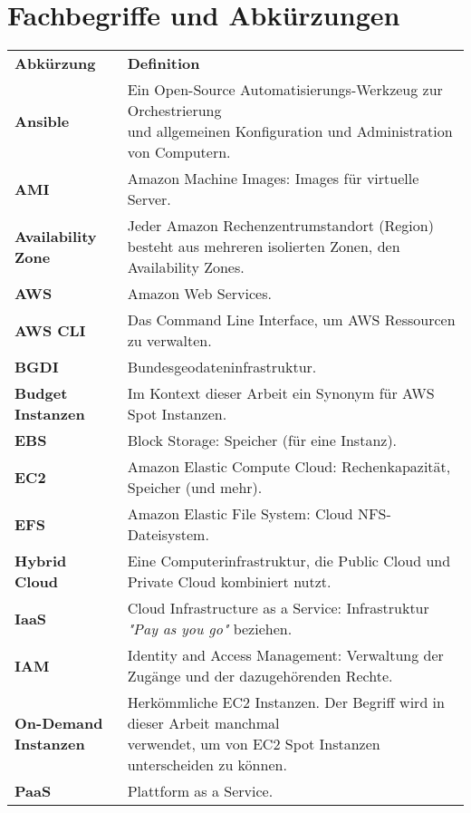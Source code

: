 \section{Fachbegriffe und Abkürzungen}
\begin{table}[!htbp]
\begin{tabular}{p{}p{}}
    \textbf{Abkürzung} & \textbf{Definition}\\
    \textbf{Ansible} & \makecell[l]{Ein Open-Source Automatisierungs-Werkzeug zur Orchestrierung\\ und allgemeinen Konfiguration und Administration von Computern.}\\
    \textbf{AMI} & Amazon Machine Images: Images für virtuelle Server.\\
    \textbf{Availability Zone} & \makecell[l]{Jeder Amazon Rechenzentrumstandort (Region)\\
    besteht aus mehreren isolierten Zonen, den Availability Zones.}\\
    \textbf{AWS} & Amazon Web Services.\\
    \textbf{AWS CLI} & Das Command Line Interface, um AWS Ressourcen zu verwalten.\\
    \textbf{BGDI} & Bundesgeodateninfrastruktur.\\
    \textbf{Budget Instanzen} & Im Kontext dieser Arbeit ein Synonym für AWS Spot Instanzen.\\
    \textbf{EBS} & Block Storage: Speicher (für eine Instanz).\\
    \textbf{EC2} & Amazon Elastic Compute Cloud: Rechenkapazität, Speicher (und mehr).\\
    \textbf{EFS} & Amazon Elastic File System: Cloud NFS-Dateisystem.\\
    \textbf{Hybrid Cloud} & Eine Computerinfrastruktur, die Public Cloud und Private Cloud kombiniert nutzt.\\
    \textbf{IaaS} & Cloud Infrastructure as a Service: Infrastruktur \emph{"Pay as you go"} beziehen.\\
    \textbf{IAM} & Identity and Access Management: Verwaltung der Zugänge und der dazugehörenden Rechte.\\
    \makecell[l]{\textbf{On-Demand}\\ \textbf{Instanzen}} & \makecell[l]{Herkömmliche EC2 Instanzen. Der Begriff wird in dieser Arbeit manchmal\\ verwendet, um von EC2 Spot Instanzen unterscheiden zu können.}\\
	\textbf{PaaS} & Plattform as a Service.\\

\end{tabular}
\end{table}
